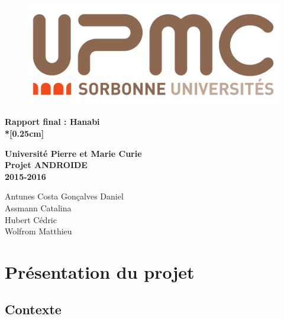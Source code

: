 \documentclass[11pt, letterpaper]{article}
\begin{document}
\pagestyle{fancy}

\renewcommand{\headrulewidth}{1pt}
\rhead{}

\begin{titlepage}

\centering
\begin{figure}[t]
\begin{center}
\includegraphics[scale = 0.2]{upmc.png}
\end{center}
\end{figure}

\begin{center}
\par\vspace {2.5cm}
{\Huge\textbf{Rapport final : Hanabi\\*[0.25cm]}}   
\par\vspace {2cm}
{\Large\textbf{Université Pierre et Marie Curie\\ Projet ANDROIDE\\
               2015-2016}}                   
\par\vspace {2cm}
{\Large{Antunes Costa Gonçalves Daniel}}\\
{\Large{Assmann Catalina }}\\ 
{\Large{Hubert Cédric}}\\ 
{\Large{Wolfrom Matthieu}}\\
\end{center}

\end{titlepage}

\newpage

\tableofcontents

\newpage
{}

\section{Présentation du projet}

\subsection{Contexte}
\end{document}
